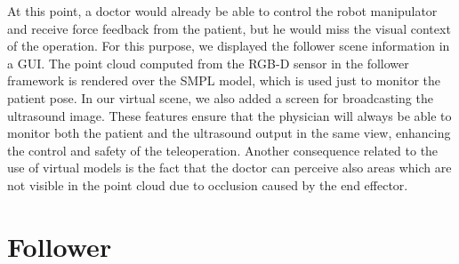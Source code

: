 At this point, a doctor would already be able to control the robot manipulator and receive force feedback from the patient, but he would miss the visual context of the operation. For this purpose, we displayed the follower scene information in a GUI.
The point cloud computed from the RGB-D sensor in the follower framework is rendered over the SMPL model, which is used just to monitor the patient pose. In our virtual scene, we also added a screen for broadcasting the ultrasound image. These features ensure that the physician will always be able to monitor both the patient and the ultrasound output in the same view, enhancing the control and safety of the teleoperation. Another consequence related to the use of virtual models is the fact that the doctor can perceive also areas which are not visible in the point cloud due to occlusion caused by the end effector.





\section{Follower}

